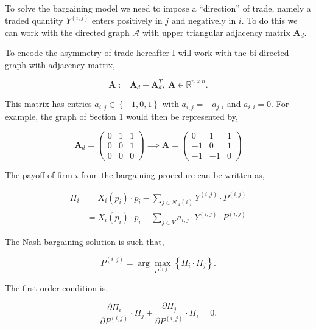 \documentclass[american]{scrartcl}
\newcommand{\R}{\mathbb{R}}
\newcommand{\matr}[1]{\bm{#1}}
\newcommand{\set}[1]{\left\{#1\right\}}
\begin{document}
To solve the bargaining model we need to impose a ``direction'' of trade, namely a traded quantity $Y^{(i, j)}$ enters positively in $j$ and negatively in $i$. To do this we can work with the directed graph $\mathcal{A}$ with upper triangular adjacency matrix $\matr{A}_{d}$.

To encode the asymmetry of trade hereafter I will work with the bi-directed graph with adjacency matrix,

\begin{equation}
	\matr{A} := \matr{A}_{d} - \matr{A}_{d}^T,  \ \matr{A} \in\R^{n\times n}.
\end{equation}

This matrix has entries $a_{i, j} \in \set{-1, 0, 1}$ with $a_{i, j} = - a_{j, i}$ and $a_{i, i} = 0$. For example, the graph of Section 1 would then be represented by,

\begin{equation}
	\matr{A}_d= \begin{pmatrix}
		0 & 1 & 1 \\
		0 & 0 & 1 \\
		0 & 0 & 0
	\end{pmatrix} \implies
	\matr{A} = \begin{pmatrix}
		0  & 1  & 1 \\
		-1 & 0  & 1 \\
		-1 & -1 & 0
	\end{pmatrix}
\end{equation}

The payoff of firm $i$ from the bargaining procedure can be written as,

\begin{equation}
	\begin{split}
		\Pi_i &= X_i(p_i)\cdot p_i - \sum_{j \in N_{\mathcal{A}}(i)} Y^{(i, j)} \cdot P^{(i, j)} \\
		&= X_i(p_i)\cdot p_i - \sum_{j \in V} a_{i, j} \cdot Y^{(i, j)} \cdot P^{(i, j)}
	\end{split}
\end{equation}

The Nash bargaining solution is such that,

\begin{equation}
	P^{(i, j)} = \arg \max_{P^{(i, j)}} \left\{\Pi_i \cdot \Pi_j \right\}.
\end{equation}

The first order condition is,

\begin{equation}
	\frac{\partial\Pi_i}{\partial P^{(i, j)}} \cdot \Pi_j + \frac{\partial\Pi_j}{\partial P^{(i, j)}} \cdot \Pi_i = 0.
\end{equation}
\end{document}
